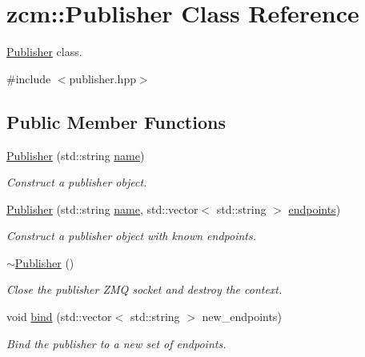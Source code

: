 \hypertarget{classzcm_1_1Publisher}{}\section{zcm\+:\+:Publisher Class Reference}
\label{classzcm_1_1Publisher}


\hyperlink{classzcm_1_1Publisher}{Publisher} class.  




{\ttfamily \#include $<$publisher.\+hpp$>$}

\subsection*{Public Member Functions}
\begin{DoxyCompactItemize}
\item 
\hyperlink{classzcm_1_1Publisher_a42553620c51aa767ad77fd527c660199}{Publisher} (std\+::string \hyperlink{classzcm_1_1Publisher_a2e3902339b55647dc6a7d2f3de64d8fe}{name})
\begin{DoxyCompactList}\small\item\em Construct a publisher object. \end{DoxyCompactList}\item 
\hyperlink{classzcm_1_1Publisher_adb0e344d4ab2bdd62de874a29404543b}{Publisher} (std\+::string \hyperlink{classzcm_1_1Publisher_a2e3902339b55647dc6a7d2f3de64d8fe}{name}, std\+::vector$<$ std\+::string $>$ \hyperlink{classzcm_1_1Publisher_a34548b5f2611391263acd10cb7d197e5}{endpoints})
\begin{DoxyCompactList}\small\item\em Construct a publisher object with known endpoints. \end{DoxyCompactList}\item 
\hyperlink{classzcm_1_1Publisher_adde9cdf939d305abeec3ef98331f5f40}{$\sim$\+Publisher} ()
\begin{DoxyCompactList}\small\item\em Close the publisher Z\+MQ socket and destroy the context. \end{DoxyCompactList}\item 
void \hyperlink{classzcm_1_1Publisher_a74a5e00ea8b49a70e4077727b318864f}{bind} (std\+::vector$<$ std\+::string $>$ new\+\_\+endpoints)
\begin{DoxyCompactList}\small\item\em Bind the publisher to a new set of endpoints. \end{DoxyCompactList}\item 

\end{DoxyCompactItemize}
